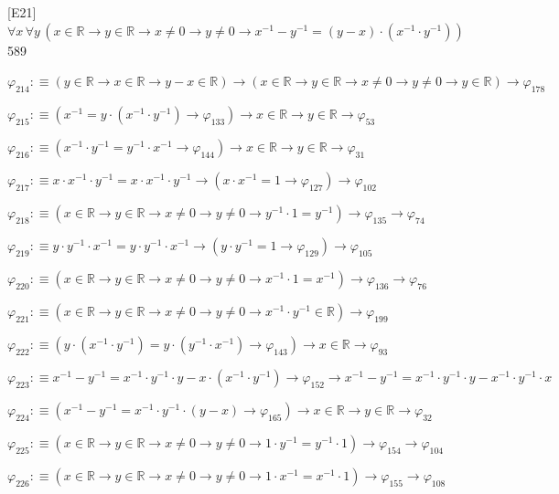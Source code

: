 \begin{fullproof}{[E21]}{$\forall x\,\forall y\,(x \in \mathbb{R} \to y \in \mathbb{R} \to x \neq 0 \to y \neq 0 \to x^{-1} - y^{-1} = (y - x) \cdot (x^{-1} \cdot y^{-1}))$}{589}
\begin{abbrevlist}
\item $\varphi_{214} :\equiv (y \in \mathbb{R} \to x \in \mathbb{R} \to y - x \in \mathbb{R}) \to (x \in \mathbb{R} \to y \in \mathbb{R} \to x \neq 0 \to y \neq 0 \to y \in \mathbb{R}) \to \varphi_{178}$
\item $\varphi_{215} :\equiv (x^{-1} = y \cdot (x^{-1} \cdot y^{-1}) \to \varphi_{133}) \to x \in \mathbb{R} \to y \in \mathbb{R} \to \varphi_{53}$
\item $\varphi_{216} :\equiv (x^{-1} \cdot y^{-1} = y^{-1} \cdot x^{-1} \to \varphi_{144}) \to x \in \mathbb{R} \to y \in \mathbb{R} \to \varphi_{31}$
\item $\varphi_{217} :\equiv x \cdot x^{-1} \cdot y^{-1} = x \cdot x^{-1} \cdot y^{-1} \to (x \cdot x^{-1} = 1 \to \varphi_{127}) \to \varphi_{102}$
\item $\varphi_{218} :\equiv (x \in \mathbb{R} \to y \in \mathbb{R} \to x \neq 0 \to y \neq 0 \to y^{-1} \cdot 1 = y^{-1}) \to \varphi_{135} \to \varphi_{74}$
\item $\varphi_{219} :\equiv y \cdot y^{-1} \cdot x^{-1} = y \cdot y^{-1} \cdot x^{-1} \to (y \cdot y^{-1} = 1 \to \varphi_{129}) \to \varphi_{105}$
\item $\varphi_{220} :\equiv (x \in \mathbb{R} \to y \in \mathbb{R} \to x \neq 0 \to y \neq 0 \to x^{-1} \cdot 1 = x^{-1}) \to \varphi_{136} \to \varphi_{76}$
\item $\varphi_{221} :\equiv (x \in \mathbb{R} \to y \in \mathbb{R} \to x \neq 0 \to y \neq 0 \to x^{-1} \cdot y^{-1} \in \mathbb{R}) \to \varphi_{199}$
\item $\varphi_{222} :\equiv (y \cdot (x^{-1} \cdot y^{-1}) = y \cdot (y^{-1} \cdot x^{-1}) \to \varphi_{143}) \to x \in \mathbb{R} \to \varphi_{93}$
\item $\varphi_{223} :\equiv x^{-1} - y^{-1} = x^{-1} \cdot y^{-1} \cdot y - x \cdot (x^{-1} \cdot y^{-1}) \to \varphi_{152} \to x^{-1} - y^{-1} = x^{-1} \cdot y^{-1} \cdot y - x^{-1} \cdot y^{-1} \cdot x$
\item $\varphi_{224} :\equiv (x^{-1} - y^{-1} = x^{-1} \cdot y^{-1} \cdot (y - x) \to \varphi_{165}) \to x \in \mathbb{R} \to y \in \mathbb{R} \to \varphi_{32}$
\item $\varphi_{225} :\equiv (x \in \mathbb{R} \to y \in \mathbb{R} \to x \neq 0 \to y \neq 0 \to 1 \cdot y^{-1} = y^{-1} \cdot 1) \to \varphi_{154} \to \varphi_{104}$
\item $\varphi_{226} :\equiv (x \in \mathbb{R} \to y \in \mathbb{R} \to x \neq 0 \to y \neq 0 \to 1 \cdot x^{-1} = x^{-1} \cdot 1) \to \varphi_{155} \to \varphi_{108}$

\end{abbrevlist}
\end{fullproof}

